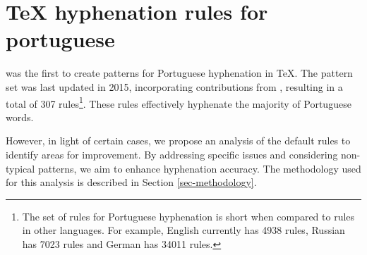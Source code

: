 \section{\TeX{} hyphenation rules for portuguese}\label{sec-tex-hyphen-pt}
\textcite{rezende1987} was the first to create patterns for Portuguese hyphenation
in \TeX{}. The pattern set was last updated in 2015, incorporating
contributions from %
\textcite{hyphpt}, resulting in a total
of 307 rules\footnote{The set of rules for Portuguese hyphenation is short when
compared to rules in other languages. For example, English currently has 4938
rules, Russian has 7023 rules and German has 34011 rules.}. 
These rules effectively hyphenate the majority of Portuguese words.

However, in light of certain cases, we propose an analysis of the default rules
to identify areas for improvement. By addressing specific issues and
considering non-typical patterns, we aim to enhance hyphenation accuracy. The
methodology used for this analysis is described in Section
\ref{sec-methodology}.

